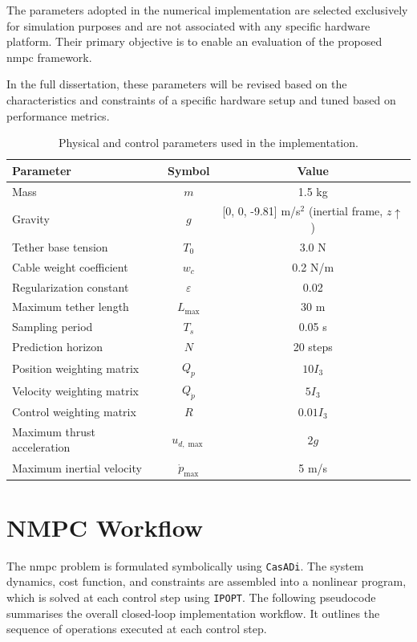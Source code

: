The parameters adopted in the numerical implementation are selected exclusively for simulation purposes and are not associated with any specific hardware platform. Their primary objective is to enable an evaluation of the proposed \gls{nmpc} framework.

In the full dissertation, these parameters will be revised based on the characteristics and constraints of a specific hardware setup and tuned based on performance metrics.

\begin{table}[H]
\centering
\caption{Physical and control parameters used in the implementation.}
\begin{tabular}{lcc}
\toprule
Parameter & Symbol & Value \\
\midrule
Mass & \(m\) & 1.5 kg \\
Gravity & \(g\) & [0, 0, -9.81] m/s\(^2\) (inertial frame, \(z\uparrow\)) \\
Tether base tension & \(T_0\) & 3.0 N \\
Cable weight coefficient & \(w_c\) & 0.2 N/m \\
Regularization constant & \(\varepsilon\) & 0.02 \\
Maximum tether length & \(L_{\max}\) & 30 m \\
Sampling period & \(T_s\) & 0.05 s \\
Prediction horizon & \(N\) & 20 steps \\
Position weighting matrix & \(Q_p\) & \(10I_3\) \\
Velocity weighting matrix & \(Q_{\dot{p}}\) & \(5I_3\) \\
Control weighting matrix & \(R\) & \(0.01I_3\) \\
Maximum thrust acceleration & \(u_{d,\max}\) & \(2g\) \\
Maximum inertial velocity & \(\dot{p}_{\max}\) & 5 m/s \\
\bottomrule
\end{tabular}
\label{tab:implementation_params}
\end{table}


\section{NMPC Workflow}
\label{sec:nmpc_workflow}

The \gls{nmpc} problem is formulated symbolically using \texttt{CasADi}. The system dynamics, cost function, and constraints are assembled into a nonlinear program, which is solved at each control step using \texttt{IPOPT}.
The following pseudocode summarises the overall closed-loop implementation workflow. It outlines the sequence of operations executed at each control step.

